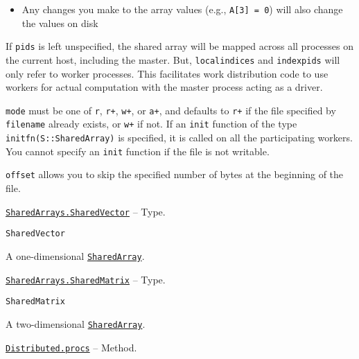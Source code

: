 \begin{adjustwidth}{2em}{0pt}
\begin{itemize}
\item Any changes you make to the array values (e.g., \texttt{A[3] = 0}) will also change the values on disk

\end{itemize}
If \texttt{pids} is left unspecified, the shared array will be mapped across all processes on the current host, including the master. But, \texttt{localindices} and \texttt{indexpids} will only refer to worker processes. This facilitates work distribution code to use workers for actual computation with the master process acting as a driver.

\texttt{mode} must be one of \texttt{{\textquotedbl}r{\textquotedbl}}, \texttt{{\textquotedbl}r+{\textquotedbl}}, \texttt{{\textquotedbl}w+{\textquotedbl}}, or \texttt{{\textquotedbl}a+{\textquotedbl}}, and defaults to \texttt{{\textquotedbl}r+{\textquotedbl}} if the file specified by \texttt{filename} already exists, or \texttt{{\textquotedbl}w+{\textquotedbl}} if not. If an \texttt{init} function of the type \texttt{initfn(S::SharedArray)} is specified, it is called on all the participating workers. You cannot specify an \texttt{init} function if the file is not writable.

\texttt{offset} allows you to skip the specified number of bytes at the beginning of the file.



\end{adjustwidth}
\hypertarget{7409079308721392752}{}
\hyperlink{7409079308721392752}{\texttt{SharedArrays.SharedVector}}  -- {Type.}

\begin{adjustwidth}{2em}{0pt}


\begin{verbatim}
SharedVector
\end{verbatim}

A one-dimensional \hyperlink{15069300442338861576}{\texttt{SharedArray}}.



\end{adjustwidth}
\hypertarget{4014464484316382916}{}
\hyperlink{4014464484316382916}{\texttt{SharedArrays.SharedMatrix}}  -- {Type.}

\begin{adjustwidth}{2em}{0pt}


\begin{verbatim}
SharedMatrix
\end{verbatim}

A two-dimensional \hyperlink{15069300442338861576}{\texttt{SharedArray}}.



\end{adjustwidth}
\hypertarget{379512234313781053}{}
\hyperlink{379512234313781053}{\texttt{Distributed.procs}}  -- {Method.}

